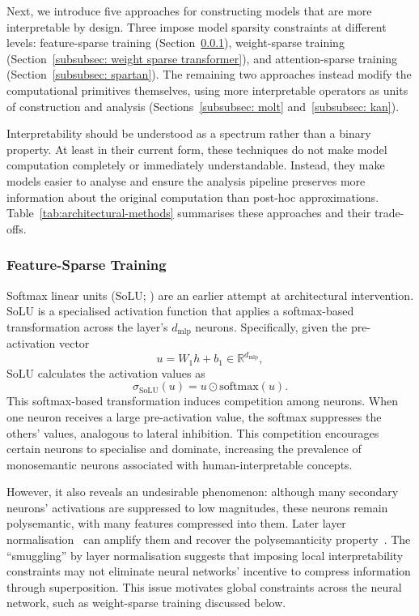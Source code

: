 Next, we introduce five approaches for constructing models that are more interpretable by design. Three impose model sparsity constraints at different levels: feature-sparse training (Section~\ref{subsubsec: solu}), weight-sparse training (Section~\ref{subsubsec: weight sparse transformer}), and attention-sparse training (Section~\ref{subsubsec: spartan}). The remaining two approaches instead modify the computational primitives themselves, using more interpretable operators as units of construction and analysis (Sections~\ref{subsubsec: molt} and~\ref{subsubsec: kan}).

Interpretability should be understood as a spectrum rather than a binary property. At least in their current form, these techniques do not make model computation completely or immediately understandable. Instead, they make models easier to analyse and ensure the analysis pipeline preserves more information about the original computation than post-hoc approximations. Table~\ref{tab:architectural-methods} summarises these approaches and their trade-offs.

\subsubsection{Feature-Sparse Training}
\label{subsubsec: solu}
Softmax linear units (SoLU; ) are an earlier attempt at architectural intervention. SoLU is a specialised activation function that applies a softmax-based transformation across the layer's $d_{\mathrm{mlp}}$ neurons. Specifically, given the pre-activation vector
\[
u = W_1 h + b_1 \in \mathbb{R}^{d_{\mathrm{mlp}}},
\]
SoLU calculates the activation values as
\begin{equation}
    \sigma_{\text{SoLU}}(u)
    =
    u \odot \mathrm{softmax}(u).
\end{equation}
This softmax-based transformation induces competition among neurons. When one neuron receives a large pre-activation value, the softmax suppresses the others' values, analogous to lateral inhibition. This competition encourages certain neurons to specialise and dominate, increasing the prevalence of monosemantic neurons associated with human-interpretable concepts. 

However, it also reveals an undesirable phenomenon: although many secondary neurons’ activations are suppressed to low magnitudes, these neurons remain polysemantic, with many features compressed into them. Later layer normalisation~ can amplify them and recover the polysemanticity property~. The ``smuggling'' by layer normalisation suggests that imposing local interpretability constraints may not eliminate neural networks’ incentive to compress information through superposition. This issue motivates global constraints across the neural network, such as weight-sparse training discussed below.

